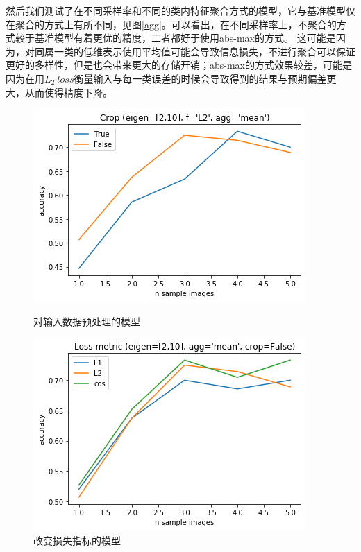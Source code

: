 \documentclass{ctexart}
\begin{document}
    然后我们测试了在不同采样率和不同的类内特征聚合方式的模型，它与基准模型仅在聚合的方式上有所不同，见图\ref{agg}。可以看出，在不同采样率上，不聚合的方式较于基准模型有着更优的精度，二者都好于使用abs-max的方式。
    这可能是因为，对同属一类的低维表示使用平均值可能会导致信息损失，不进行聚合可以保证更好的多样性，但是也会带来更大的存储开销；abs-max的方式效果较差，可能是因为在用$L_2\ loss$衡量输入与每一类误差的时候会导致得到的结果与预期偏差更大，从而使得精度下降。
    \begin{figure}[htbp]
        \begin{minipage}[t]{0.45 \linewidth}
            \centering
            \includegraphics[scale=0.45]{imgs/crop.png}
            \caption{对输入数据预处理的模型}
            \label{crop}
        \end{minipage}
        \begin{minipage}[t]{0.45 \linewidth}
            \centering
            \includegraphics[scale=0.45]{imgs/loss-metric.png}
            \caption{改变损失指标的模型}
            \label{loss}
        \end{minipage}
    \end{figure}
    
\end{document}
